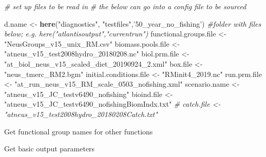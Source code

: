 \documentclass[
]{article}
\newenvironment{Shaded}{\begin{snugshade}}{\end{snugshade}}
\newcommand{\CommentTok}[1]{\textcolor[rgb]{0.56,0.35,0.01}{\textit{#1}}}
\newcommand{\DataTypeTok}[1]{\textcolor[rgb]{0.13,0.29,0.53}{#1}}
\newcommand{\DecValTok}[1]{\textcolor[rgb]{0.00,0.00,0.81}{#1}}
\newcommand{\KeywordTok}[1]{\textcolor[rgb]{0.13,0.29,0.53}{\textbf{#1}}}
\newcommand{\NormalTok}[1]{#1}
\newcommand{\OperatorTok}[1]{\textcolor[rgb]{0.81,0.36,0.00}{\textbf{#1}}}
\newcommand{\StringTok}[1]{\textcolor[rgb]{0.31,0.60,0.02}{#1}}
\begin{document}
\begin{Shaded}
\begin{Highlighting}[]
\CommentTok{# set up files to be read in}
\CommentTok{# the below can go into a config file to be sourced}

\NormalTok{d.name <-}\StringTok{ }\KeywordTok{here}\NormalTok{(}\StringTok{"diagnostics"}\NormalTok{, }\StringTok{"testfiles"}\NormalTok{,}\StringTok{'50_year_no_fishing'}\NormalTok{) }\CommentTok{#folder with files below; e.g. here("atlantisoutput","currentrun")}
\NormalTok{functional.groups.file <-}\StringTok{ "NeusGroups_v15_unix_RM.csv"}
\NormalTok{biomass.pools.file <-}\StringTok{ "atneus_v15_test2008hydro_20180208.nc"}
\NormalTok{biol.prm.file <-}\StringTok{ "at_biol_neus_v15_scaled_diet_20190924_2.xml"}
\NormalTok{box.file <-}\StringTok{ "neus_tmerc_RM2.bgm"}
\NormalTok{initial.conditions.file <-}\StringTok{ "RMinit4_2019.nc"}
\NormalTok{run.prm.file <-}\StringTok{ "at_run_neus_v15_RM_scale_0503_nofishing.xml"}
\NormalTok{scenario.name <-}\StringTok{ "atneus_v15_JC_testv6490_nofishing"}
\NormalTok{bioind.file <-}\StringTok{ "atneus_v15_JC_testv6490_nofishingBiomIndx.txt"}
\CommentTok{# catch.file <- "atneus_v15_test2008hydro_20180208Catch.txt"}
\end{Highlighting}
\end{Shaded}

Get functional group names for other functions

\begin{Shaded}
\end{Shaded}

Get basic output parameters
\end{document}
